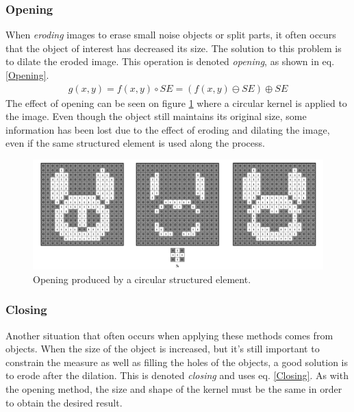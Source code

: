 \subsubsection{Opening}
When \textit{eroding} images to erase small noise objects or split parts, it often occurs that the object of interest has decreased its size. The solution to this problem is to dilate the eroded image. This operation is denoted \textit{opening}, as shown in eq. \ref{Opening}.
\begin{equation}
\begin{aligned}
{g(x,y)}={f(x,y)}\circ{SE}=({f(x,y)}\ominus{SE})\oplus{SE}
\label{Opening}
	\end{aligned}
\end{equation}
The effect of opening can be seen on figure \ref{fig:Opening} where a circular kernel is applied to the image. Even though the object still maintains its original size, some information has been lost due to the effect of eroding and dilating the image, even if the same structured element is used along the process.

\begin{figure}[htbp]
\centering
\includegraphics[width=1\textwidth]{Pictures/Theory/OpeningCirc.png}
\caption{Opening produced by a circular structured element.}
\label{fig:Opening}
\end{figure}

\subsubsection{Closing}
Another situation that often occurs when applying these methods comes from objects. When the size of the object is increased, but it's still important to constrain the measure as well as filling the holes of the objects, a good solution is to erode after the dilation. This is denoted \textit{closing} and uses eq. \ref{Closing}. As with the opening method, the size and shape of the kernel must be the same in order to obtain the desired result.

